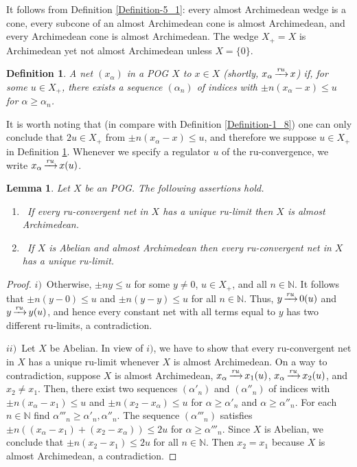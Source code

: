 \documentclass[10pt]{article}
\newtheorem{lemma}{Lemma}[section]
\newtheorem{definition}{Definition}[section]
\DeclareMathOperator{\convr}{\xrightarrow[]{{\it ru}}}
\renewcommand{\a}{\alpha}
\begin{document}
\noindent
It follows from Definition \ref{Definition-5_1}: every almost Archimedean wedge is a cone, every subcone of an almost Archimedean cone is almost Archimedean, and
every Archimedean cone is almost Archime\-dean. The wedge $X_+=X$ is Archimedean yet not almost Archimedean unless $X=\{0\}$.

\begin{definition}\label{Definition-5_2}
A net $(x_{\a})$ in a POG $X$ {\color{blue}{ru-converges}} to $x\in X$ {\em (}shortly, $x_{\a}\convr x${\em )} 
if, for some $u\in X_+$, there exists a sequence $({\a}_n)$ of indices with $\pm n(x_{\a}-x)\leqslant u$ for ${\a}\geqslant{\a}_n$.
\end{definition}

\noindent
It is worth noting that (in compare with Definition \ref{Definition-1_8}) one can only conclude that $2u\in X_+$ from $\pm n(x_{\a}-x)\leqslant u$,
and therefore we suppose $u\in X_+$ in Definition \ref{Definition-5_2}. Whenever we specify a regulator $u$ of the ru-convergence, we write $x_{\a}\convr x(u)$. 

\begin{lemma}\label{Lemma-5_1}
Let $X$ be an POG. The following assertions hold.
\begin{enumerate}[$i)$]
\item\
If every ru-convergent net in $X$ has a unique ru-limit then $X$ is almost Archime\-dean.
\item\
If $X$ is Abelian and almost Archime\-dean then every ru-convergent net in $X$ has a unique ru-limit.
\end{enumerate}
\end{lemma}

\begin{proof}
$i)$\ 
Otherwise, $\pm ny\leqslant u$ for some $y\ne 0$, $u\in X_+$, and all $n\in\mathbb{N}$.
It follows that $\pm n(y-0)\leqslant u$ and $\pm n(y-y)\leqslant u$ for all $n\in\mathbb{N}$. Thus, $y\convr 0(u)$ and $y\convr y(u)$, and hence 
every constant net with all terms equal to $y$ has two different ru-limits, a contradiction.

\medskip
$ii)$\ 
Let $X$ be Abelian. In view of $i)$, we have to show that every ru-convergent net in $X$ has a unique ru-limit
whenever $X$ is almost Archime\-dean. On a way to contradiction, suppose $X$ is almost Archime\-dean, $x_{\a}\convr x_1(u)$, $x_{\a}\convr x_2(u)$, and $x_2\ne x_1$.
Then, there exist two sequences $({\a}'_n)$ and $({\a}''_n)$ of indices with $\pm n(x_{\a}-x_1)\leqslant u$ 
and $\pm n(x_2-x_{\a})\leqslant u$ for ${\a}\geqslant{\a}'_n$ and ${\a}\geqslant{\a}''_n$. For each $n\in\mathbb{N}$ find 
${\a}'''_n\geqslant{\a}'_n,{\a}''_n$. The sequence $({\a}'''_n)$ satisfies
$\pm n((x_{\a}-x_1)+(x_2-x_{\a}))\leqslant 2u$ for ${\a}\geqslant{\a}'''_n$. Since $X$ is Abelian,
we conclude that $\pm n(x_2-x_1)\leqslant 2u$ for all $n\in\mathbb{N}$. Then $x_2=x_1$ because $X$ is almost Archime\-dean, a contradiction.
\end{proof}
\end{document}
